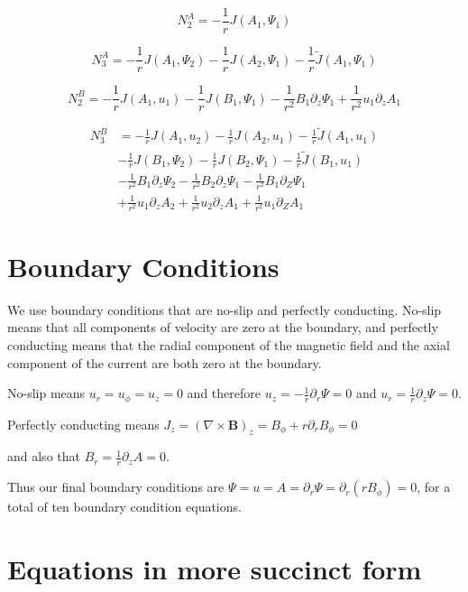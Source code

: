 \documentclass{paper}
\newcommand{\beq}{\begin{equation}}
\newcommand{\eeq}{\end{equation}}
\begin{document}
\beq
N_2^A = -\frac{1}{r} J\left(A_1, \Psi_1\right)
\eeq

\beq
N_3^A = -\frac{1}{r} J\left(A_1, \Psi_2\right) - \frac{1}{r}J\left(A_2, \Psi_1\right) - \frac{1}{r} \widetilde{J}\left(A_1, \Psi_1\right)
\eeq

\beq
N_2^B = -\frac{1}{r} J\left(A_1, u_1\right) - \frac{1}{r} J\left(B_1, \Psi_1\right) - \frac{1}{r^2} B_1 \partial_z \Psi_1 + \frac{1}{r^2} u_1 \partial_z A_1
\eeq

\beq
\begin{split}
N_3^B & = - \frac{1}{r} J\left(A_1, u_2\right) - \frac{1}{r} J\left(A_2, u_1\right) - \frac{1}{r}\widetilde{J}\left(A_1, u_1\right) \\
& - \frac{1}{r} J\left(B_1, \Psi_2\right) - \frac{1}{r} J\left(B_2, \Psi_1\right) - \frac{1}{r} \widetilde{J} \left(B_1, u_1\right) \\
& - \frac{1}{r^2} B_1\partial_z \Psi_2 - \frac{1}{r^2} B_2 \partial_z \Psi_1 - \frac{1}{r^2} B_1 \partial_Z \Psi_1 \\
& + \frac{1}{r^2} u_1 \partial_z A_2 + \frac{1}{r^2} u_2 \partial_z A_1 + \frac{1}{r^2} u_1 \partial_Z A_1
\end{split}
\eeq

\section{Boundary Conditions}

We use boundary conditions that are no-slip and perfectly conducting. No-slip means that all components of velocity are zero at the boundary, and perfectly conducting means that the radial component of the magnetic field and the axial component of the current are both zero at the boundary. 

No-slip means $u_r = u_\phi = u_z = 0$ and therefore $u_z = - \frac{1}{r}\partial_r \Psi = 0$ and $u_r = \frac{1}{r}\partial_z \Psi = 0$. 

Perfectly conducting means $J_z = (\nabla \times \mathbf{B})_z = B_\phi + r\partial_r B_\phi = 0$

and also that $B_r = \frac{1}{r}\partial_z A = 0$.

Thus our final boundary conditions are $\Psi = u = A = \partial_r \Psi = \partial_r(r B_\phi) = 0$, for a total of ten boundary condition equations.


\section{Equations in more succinct form}
\end{document}
